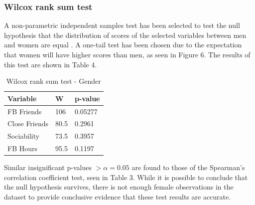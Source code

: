 \subsubsection{Wilcox rank sum test}


A non-parametric independent samples test has been selected to test the null hypothesis that the distribution of scores of the selected variables between men and women are equal \citep{Coolican2014}. A one-tail test has been chosen due to the expectation that women will have higher scores than men, as seen in Figure 6. The results of this test are shown in Table 4.





\begin{table}[H]
\centering
\caption{Wilcox rank sum test - Gender}
\begin{tabular}{l|l|l}
Variable      & W    & p-value \\ \hline
FB Friends    & 106  & 0.05277 \\ \hline
Close Friends & 80.5 & 0.2961  \\ \hline
Sociability   & 73.5 & 0.3957  \\ \hline
FB Hours      & 95.5 & 0.1197  \\ \hline
\end{tabular}
\end{table}

Similar insignificant p-values $> \alpha = 0.05$ are found to those of the Spearman's correlation coefficient test, seen in Table 3. While it is possible to conclude that the null hypothesis survives, there is not enough female observations in the dataset to provide conclusive evidence that these test results are accurate.